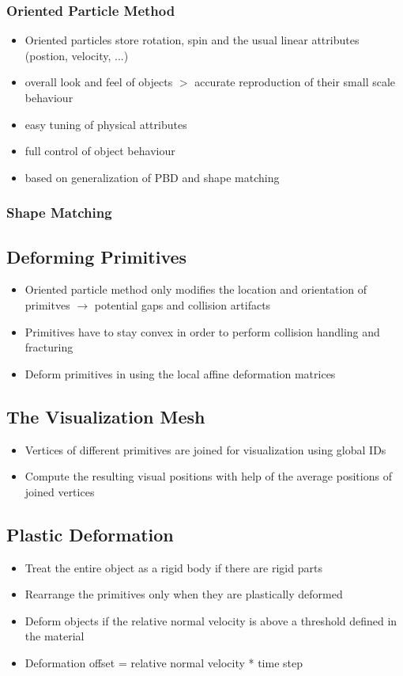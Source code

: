 \documentclass[
	11pt, 
	DIV10,
	a4paper, 
	oneside, 
	headings=normal, 
	captions=tableheading,
	final, 
	numbers=noenddot
]{scrartcl}
\begin{document}
\subsubsection{Oriented Particle Method}
	\begin{itemize}
		\item Oriented particles store rotation, spin and the usual linear attributes (postion, velocity, ...)
		\item overall look and feel of objects $>$ accurate reproduction of their small scale behaviour 
		\item easy tuning of physical attributes
		\item full control of object behaviour
		\item based on generalization of PBD and shape matching
	\end{itemize}
\subsubsection{Shape Matching}

\subsection{Deforming Primitives}
	\begin{itemize}
		\item Oriented particle method only modifies the location and orientation of primitves $\rightarrow$ potential gaps and collision artifacts
		\item Primitives have to stay convex in order to perform collision handling and fracturing
		\item Deform primitives in using the local affine deformation matrices	
	\end{itemize}

\subsection{The Visualization Mesh}
	\begin{itemize}
		\item Vertices of different primitives are joined for visualization using global IDs
		\item Compute the resulting visual positions with help of the average positions of joined vertices
	\end{itemize}	

\subsection{Plastic Deformation}
	\begin{itemize}
		\item Treat the entire object as a rigid body if there are rigid parts
		\item Rearrange the primitives only when they are plastically deformed
		\item Deform objects if the relative normal velocity is above a threshold defined in the material
		\item Deformation offset = relative normal velocity * time step
	\end{itemize}
\end{document}
